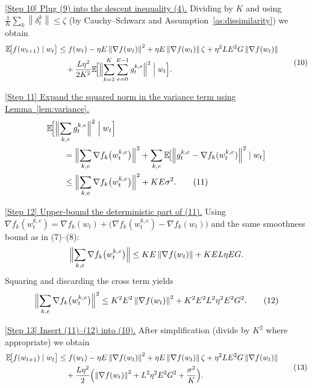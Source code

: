 \documentclass{article}
\newcommand{\E}{\mathbb{E}}
\newcommand{\norm}[1]{\left\|#1\right\|}
\begin{document}
\noindent\underline{[Step 10] Plug (9) into the descent inequality (4).}
Dividing by $K$ and using $\frac{1}{K}\sum_{k}\norm{\delta_{t}^{k}}\le \zeta$ (by Cauchy–Schwarz and Assumption~\ref{as:dissimilarity}) we obtain
\[
\begin{aligned}
\E\!\bigl[f(w_{t+1})\mid w_t\bigr]
&\le f(w_t)
   -\eta E \norm{\nabla f(w_t)}^{2}
   +\eta E \norm{\nabla f(w_t)}\zeta
   +\eta^{2}L E^{2} G\norm{\nabla f(w_t)} \\
&\quad +\frac{L\eta^{2}}{2K^{2}}
   \E\!\Bigl[\Bigl\|\sum_{k=1}^{K}\sum_{e=0}^{E-1} g_{t}^{k,e}\Bigr\|^{2}\Bigm| w_t\Bigr].
\end{aligned}
\tag{10}
\]

\noindent\underline{[Step 11] Expand the squared norm in the variance term using Lemma~\ref{lem:variance}.}
\[
\begin{aligned}
&\E\!\Bigl[\Bigl\|\sum_{k,e} g_{t}^{k,e}\Bigr\|^{2}\Bigm| w_t\Bigr] \\
&\qquad =\Bigl\|\sum_{k,e}\nabla f_k\bigl(w_{t}^{k,e}\bigr)\Bigr\|^{2}
        +\sum_{k,e}\E\!\bigl[\norm{g_{t}^{k,e}-\nabla f_k(w_{t}^{k,e})}^{2}\mid w_t\bigr] \\
&\qquad \le \Bigl\|\sum_{k,e}\nabla f_k\bigl(w_{t}^{k,e}\bigr)\Bigr\|^{2}
        +K E \sigma^{2}. \tag{11}
\end{aligned}
\]

\noindent\underline{[Step 12] Upper‑bound the deterministic part of (11).}
Using $\nabla f_k(w_{t}^{k,e})=\nabla f_k(w_t)+\bigl(\nabla f_k(w_{t}^{k,e})-\nabla f_k(w_t)\bigr)$ and the same smoothness bound as in (7)–(8):
\[
\Bigl\|\sum_{k,e}\nabla f_k\bigl(w_{t}^{k,e}\bigr)\Bigr\|
\le K E \norm{\nabla f(w_t)} + K E L\eta E G .
\]
Squaring and discarding the cross term yields
\[
\Bigl\|\sum_{k,e}\nabla f_k\bigl(w_{t}^{k,e}\bigr)\Bigr\|^{2}
\le K^{2}E^{2}\norm{\nabla f(w_t)}^{2}+K^{2}E^{2}L^{2}\eta^{2}E^{2}G^{2}. \tag{12}
\]

\noindent\underline{[Step 13] Insert (11)–(12) into (10).}
After simplification (divide by $K^{2}$ where appropriate) we obtain
\[
\begin{aligned}
\E\!\bigl[f(w_{t+1})\mid w_t\bigr]
&\le f(w_t)
   -\eta E \norm{\nabla f(w_t)}^{2}
   +\eta E \norm{\nabla f(w_t)}\zeta
   +\eta^{2}L E^{2} G\norm{\nabla f(w_t)} \\
&\quad +\frac{L\eta^{2}}{2}\Bigl(
        \norm{\nabla f(w_t)}^{2}
        +L^{2}\eta^{2}E^{2}G^{2}
        +\frac{\sigma^{2}}{K}
      \Bigr).
\end{aligned}
\tag{13}
\]
\end{document}

